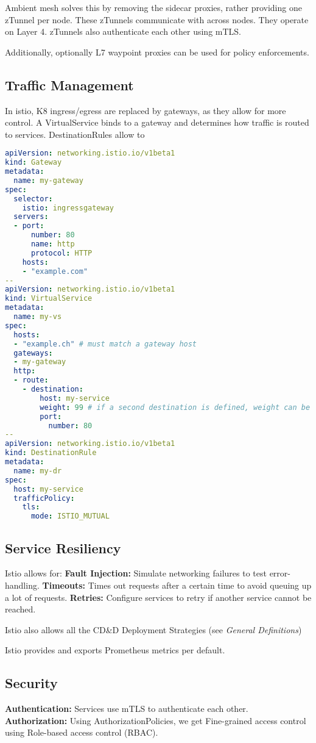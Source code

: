 Ambient mesh solves this by removing the sidecar proxies, rather providing one zTunnel per node. These zTunnels communicate with across nodes. They operate on Layer 4. zTunnels also authenticate each other using mTLS.

Additionally, optionally L7 waypoint proxies can be used for policy enforcements.

\subsection{Traffic Management}
In istio, K8 ingress/egress are replaced by gateways, as they allow for more control.
A VirtualService binds to a gateway and determines how traffic is routed to services.
DestinationRules allow to
\begin{lstlisting}[language=yaml]
apiVersion: networking.istio.io/v1beta1
kind: Gateway
metadata:
  name: my-gateway
spec:
  selector:
    istio: ingressgateway
  servers:
  - port:
      number: 80
      name: http
      protocol: HTTP
    hosts:
    - "example.com"
--
apiVersion: networking.istio.io/v1beta1
kind: VirtualService
metadata:
  name: my-vs
spec:
  hosts:
  - "example.ch" # must match a gateway host
  gateways:
  - my-gateway
  http:
  - route:
    - destination:
        host: my-service
        weight: 99 # if a second destination is defined, weight can be used to split traffic accordingly
        port:
          number: 80
--
apiVersion: networking.istio.io/v1beta1
kind: DestinationRule
metadata:
  name: my-dr
spec:
  host: my-service
  trafficPolicy:
    tls:
      mode: ISTIO_MUTUAL
\end{lstlisting}

\subsection{Service Resiliency}
Istio allows for:
\textbf{Fault Injection:} Simulate networking failures to test error-handling.
\textbf{Timeouts:} Times out requests after a certain time to avoid queuing up a lot of requests.
\textbf{Retries:} Configure services to retry if another service cannot be reached.

Istio also allows all the CD\&D Deployment Strategies (see \textit{General Definitions})

Istio provides and exports Prometheus metrics per default.

\subsection{Security}
\textbf{Authentication:} Services use mTLS to authenticate each other. \\
\textbf{Authorization:} Using AuthorizationPolicies, we get Fine-grained access control using Role-based access control (RBAC).

